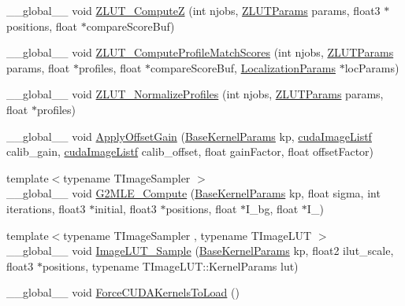 \begin{DoxyCompactItemize}
\item 
\+\_\+\+\_\+global\+\_\+\+\_\+ void \hyperlink{group__kernels_gad0ba2ca03fcfe17bda05c872842afaae}{Z\+L\+U\+T\+\_\+\+ComputeZ} (int njobs, \hyperlink{struct_z_l_u_t_params}{Z\+L\+U\+T\+Params} params, float3 $\ast$positions, float $\ast$compare\+Score\+Buf)
\item 
\+\_\+\+\_\+global\+\_\+\+\_\+ void \hyperlink{group__kernels_gab39221cb109c517ef2c550742f25fae3}{Z\+L\+U\+T\+\_\+\+Compute\+Profile\+Match\+Scores} (int njobs, \hyperlink{struct_z_l_u_t_params}{Z\+L\+U\+T\+Params} params, float $\ast$profiles, float $\ast$compare\+Score\+Buf, \hyperlink{struct_localization_params}{Localization\+Params} $\ast$loc\+Params)
\item 
\+\_\+\+\_\+global\+\_\+\+\_\+ void \hyperlink{group__kernels_ga4cdd8d9a41123399c9a91d90785d9274}{Z\+L\+U\+T\+\_\+\+Normalize\+Profiles} (int njobs, \hyperlink{struct_z_l_u_t_params}{Z\+L\+U\+T\+Params} params, float $\ast$profiles)
\item 
\+\_\+\+\_\+global\+\_\+\+\_\+ void \hyperlink{group__kernels_ga45301d4799d0b58381ecd58202724298}{Apply\+Offset\+Gain} (\hyperlink{struct_base_kernel_params}{Base\+Kernel\+Params} kp, \hyperlink{_queued_c_u_d_a_tracker_8h_a84de79f5d4b6e4c8d5622fe712c1bd69}{cuda\+Image\+Listf} calib\+\_\+gain, \hyperlink{_queued_c_u_d_a_tracker_8h_a84de79f5d4b6e4c8d5622fe712c1bd69}{cuda\+Image\+Listf} calib\+\_\+offset, float gain\+Factor, float offset\+Factor)
\item 
{\footnotesize template$<$typename T\+Image\+Sampler $>$ }\\\+\_\+\+\_\+global\+\_\+\+\_\+ void \hyperlink{group__kernels_gaf3546eed501c5227c765beb290ed2549}{G2\+M\+L\+E\+\_\+\+Compute} (\hyperlink{struct_base_kernel_params}{Base\+Kernel\+Params} kp, float sigma, int iterations, float3 $\ast$initial, float3 $\ast$positions, float $\ast$I\+\_\+bg, float $\ast$I\+\_)
\item 
{\footnotesize template$<$typename T\+Image\+Sampler , typename T\+Image\+L\+UT $>$ }\\\+\_\+\+\_\+global\+\_\+\+\_\+ void \hyperlink{group__kernels_ga570d6e0ffb7ef89d65d8805d3ea82978}{Image\+L\+U\+T\+\_\+\+Sample} (\hyperlink{struct_base_kernel_params}{Base\+Kernel\+Params} kp, float2 ilut\+\_\+scale, float3 $\ast$positions, typename T\+Image\+L\+U\+T\+::\+Kernel\+Params lut)
\item 
\+\_\+\+\_\+global\+\_\+\+\_\+ void \hyperlink{group__kernels_gac07cc2bda6c64ce2e0a496b3de40ab60}{Force\+C\+U\+D\+A\+Kernels\+To\+Load} ()
\item 

\end{DoxyCompactItemize}
